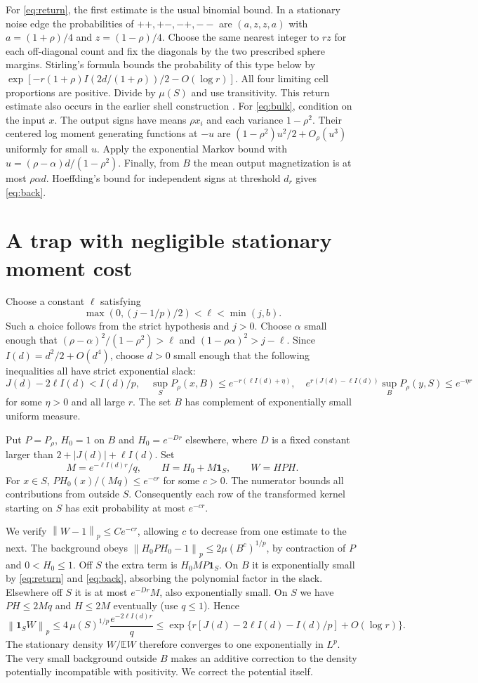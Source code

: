 \documentclass[11pt]{article}
\newcommand{\E}{\mathbb E}
\newcommand{\one}{\mathbf 1}
\newcommand{\norm}[1]{\left\|#1\right\|}
\begin{document}
For \eqref{eq:return}, the first estimate is the usual binomial bound. In a stationary noise edge the probabilities of $++,+-,-+,--$ are $(a,z,z,a)$ with $a=(1+\rho)/4$ and $z=(1-\rho)/4$. Choose the same nearest integer to $rz$ for each off-diagonal count and fix the diagonals by the two prescribed sphere margins. Stirling's formula bounds the probability of this type below by $\exp[-r(1+\rho)I(2d/(1+\rho))/2-O(\log r)]$. All four limiting cell proportions are positive. Divide by $\mu(S)$ and use transitivity. This return estimate also occurs in the earlier shell construction \cite{shell}. For \eqref{eq:bulk}, condition on the input $x$. The output signs have means $\rho x_i$ and each variance $1-\rho^2$. Their centered log moment generating functions at $-u$ are $(1-\rho^2)u^2/2+O_\rho(u^3)$ uniformly for small $u$. Apply the exponential Markov bound with $u=(\rho-\alpha)d/(1-\rho^2)$. Finally, from $B$ the mean output magnetization is at most $\rho\alpha d$. Hoeffding's bound for independent signs at threshold $d_r$ gives \eqref{eq:back}.

\section{A trap with negligible stationary moment cost}
Choose a constant $\ell$ satisfying
\[
 \max(0,(j-1/p)/2)<\ell<\min(j,b).
\]
Such a choice follows from the strict hypothesis and $j>0$. Choose $\alpha$ small enough that $(\rho-\alpha)^2/(1-\rho^2)>\ell$ and $(1-\rho\alpha)^2>j-\ell$. Since $I(d)=d^2/2+O(d^4)$, choose $d>0$ small enough that the following inequalities all have strict exponential slack:
\[
 J(d)-2\ell I(d)<I(d)/p,\quad
 \sup_S P_\rho(x,B)\le e^{-r(\ell I(d)+\eta)},\quad
 e^{r(J(d)-\ell I(d))}\sup_B P_\rho(y,S)\le e^{-\eta r}
\]
for some $\eta>0$ and all large $r$. The set $B$ has complement of exponentially small uniform measure.

Put $P=P_\rho$, $H_0=1$ on $B$ and $H_0=e^{-Dr}$ elsewhere, where $D$ is a fixed constant larger than $2+|J(d)|+\ell I(d)$. Set
\[
 M=e^{-\ell I(d)r}/q,\qquad H=H_0+M\one_S,\qquad W=H P H.
\]
For $x\in S$, $P H_0(x)/(Mq)\le e^{-c r}$ for some $c>0$. The numerator bounds all contributions from outside $S$. Consequently each row of the transformed kernel starting on $S$ has exit probability at most $e^{-c r}$.

We verify $\norm{W-1}_p\le C e^{-c r}$, allowing $c$ to decrease from one estimate to the next. The background obeys $\norm{H_0 P H_0-1}_p\le2\mu(B^c)^{1/p}$, by contraction of $P$ and $0<H_0\le1$. Off $S$ the extra term is $H_0 M P\one_S$. On $B$ it is exponentially small by \eqref{eq:return} and \eqref{eq:back}, absorbing the polynomial factor in the slack. Elsewhere off $S$ it is at most $e^{-Dr}M$, also exponentially small. On $S$ we have $PH\le 2Mq$ and $H\le2M$ eventually (use $q\le1$). Hence
\[
 \norm{\one_S W}_p
 \le 4\,\mu(S)^{1/p}\frac{e^{-2\ell I(d)r}}{q}
 \le \exp\{r[J(d)-2\ell I(d)-I(d)/p]+O(\log r)\}.
\]
The stationary density $W/\E W$ therefore converges to one exponentially in $L^p$. The very small background outside $B$ makes an additive correction to the density potentially incompatible with positivity. We correct the potential itself.
\end{document}
